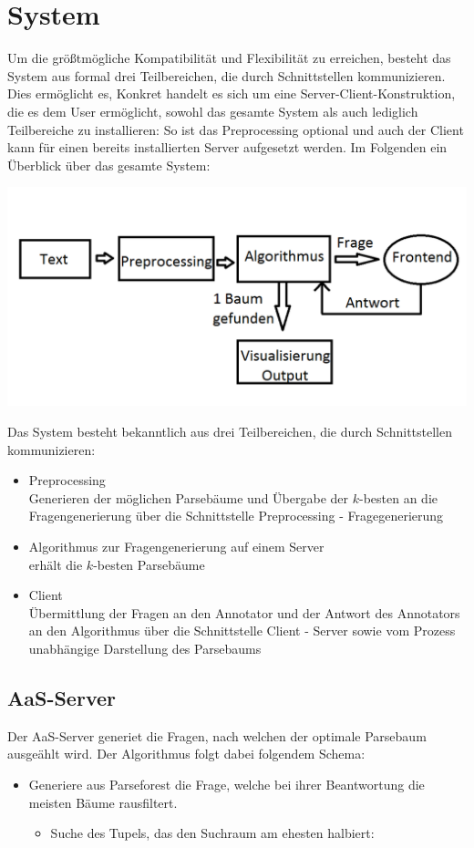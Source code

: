 \documentclass{scrartcl}
\begin{document}
\section{System}
\label{sec:System}
Um die größtmögliche Kompatibilität und Flexibilität zu erreichen, besteht das System aus formal drei Teilbereichen, die durch Schnittstellen kommunizieren. Dies ermöglicht es, 
Konkret handelt es sich um eine Server-Client-Konstruktion, die es dem User ermöglicht, sowohl das gesamte System als auch lediglich Teilbereiche zu installieren: So ist das Preprocessing optional und auch der Client kann für einen bereits installierten Server aufgesetzt werden.
Im Folgenden ein Überblick über das gesamte System:
\begin{center}
    \includegraphics[scale=0.4]{Grafik}
\end{center}
Das System besteht bekanntlich aus drei Teilbereichen, die durch Schnittstellen kommunizieren:
\begin{itemize}
\item Preprocessing\\Generieren der möglichen Parsebäume und Übergabe der $k$-besten an die Fragengenerierung über die Schnittstelle Preprocessing - Fragegenerierung
\item Algorithmus zur Fragengenerierung auf einem Server\\erhält die $k$-besten Parsebäume 
\item Client\\Übermittlung der
Fragen an den Annotator und der Antwort des Annotators an den Algorithmus über die Schnittstelle Client - Server sowie vom Prozess unabhängige Darstellung des Parsebaums 
\end{itemize}

\subsection{AaS-Server}
\label{sub:AaS-Server}
Der AaS-Server generiet die Fragen, nach welchen der optimale Parsebaum ausgeählt wird. Der Algorithmus folgt dabei folgendem Schema:
    \begin{itemize}
        \item Generiere aus Parseforest die Frage, welche bei ihrer Beantwortung die meisten Bäume rausfiltert.
            \begin{itemize}
                \item Suche des Tupels, das den Suchraum am ehesten halbiert:
            \end{itemize}
    \end{itemize}
\end{document}
